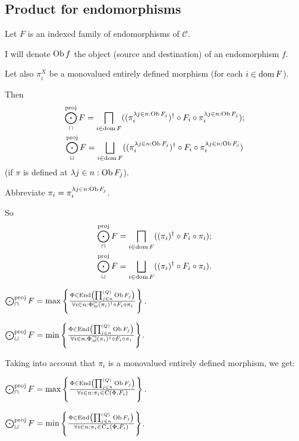\subsection{Product for endomorphisms}

Let $F$ is an indexed family of endomorphisms of $\mathcal{C}$.

I will denote $\operatorname{Ob} f$ the object (source and destination) of an
endomorphism $f$.

Let also $\pi^X_i$ be a monovalued entirely defined morphism (for each $i \in
\operatorname{dom} F$).

Then
\begin{gather*}
\bigodot^{\text{proj}}_{\sqcap} F = \bigsqcap_{i \in \dom F} ((\pi^{\lambda j \in n :
\Ob F_j}_i)^{\dagger} \circ F_i \circ \pi^{\lambda j \in n : \Ob
F_j}_i);\\
\bigodot^{\text{proj}}_{\sqcup} F = \bigsqcup_{i \in \dom F} ((\pi^{\lambda j \in n :
\Ob F_j}_i)^{\dagger} \circ F_i \circ \pi^{\lambda j \in n : \Ob
F_j}_i)
\end{gather*}
(if $\pi$ is defined at $\lambda j \in n : \operatorname{Ob} F_j$).

Abbreviate $\pi_i = \pi^{\lambda j \in n : \operatorname{Ob} F_j}_i$.

So
\begin{gather*}
\bigodot^{\text{proj}}_{\sqcap} F = \bigsqcap_{i \in \dom F} ((\pi_i)^{\dagger} \circ
F_i \circ \pi_i);\\
\bigodot^{\text{proj}}_{\sqcup} F = \bigsqcup_{i \in \dom F} ((\pi_i)^{\dagger} \circ
F_i \circ \pi_i).
\end{gather*}

$\bigodot^{\text{proj}}_{\sqcap} F = \max \left\{ \frac{ \Phi \in \operatorname{End} \left( \prod^{(Q)}_{j \in n}
\operatorname{Ob} F_j \right) }{ \forall i \in n : \Phi
\sqsubseteq (\pi_i)^{\dagger} \circ F_i \circ \pi_i }\right\}$.

$\bigodot^{\text{proj}}_{\sqcup} F = \min \left\{ \frac{ \Phi \in \operatorname{End} \left( \prod^{(Q)}_{j \in n}
\operatorname{Ob} F_j \right) }{ \forall i \in n : \Phi
\sqsupseteq (\pi_i)^{\dagger} \circ F_i \circ \pi_i }\right\}$.

Taking into account that $\pi_i$ is a monovalued entirely defined morphism, we
get:

\begin{obvious}
$\bigodot^{\text{proj}}_{\sqcap} F = \max \left\{ \frac{ \Phi \in \operatorname{End} \left( \prod^{(Q)}_{j \in
n} \operatorname{Ob} F_j \right) }{ \forall i \in n : \pi_i
\in \mathrm{C} (\Phi , F_i) }\right\}$.
\end{obvious}

\begin{obvious}
$\bigodot^{\text{proj}}_{\sqcup} F = \min \left\{ \frac{ \Phi \in \operatorname{End} \left( \prod^{(Q)}_{j \in
n} \operatorname{Ob} F_j \right) }{ \forall i \in n : \pi_i
\in \mathrm{C}_{\ast} (\Phi , F_i) }\right\}$.
\end{obvious}

